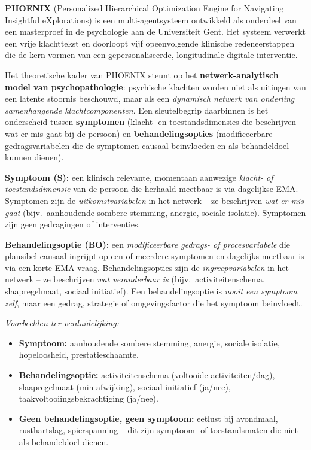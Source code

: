 \documentclass[11pt,a4paper]{article}
\begin{document}
\textbf{PHOENIX} (Personalized Hierarchical Optimization Engine for Navigating
Insightful eXplorations) is een multi-agentsysteem ontwikkeld als onderdeel van
een masterproef in de psychologie aan de Universiteit Gent. Het systeem verwerkt
een vrije klachttekst en doorloopt vijf opeenvolgende klinische redeneerstappen
die de kern vormen van een gepersonaliseerde, longitudinale digitale interventie.

Het theoretische kader van PHOENIX steunt op het \textbf{netwerk-analytisch model
van psychopathologie}: psychische klachten worden niet
als uitingen van een latente stoornis beschouwd, maar als een \emph{dynamisch
netwerk van onderling samenhangende klachtcomponenten}. Een sleutelbegrip daarbinnen
is het onderscheid tussen \textbf{symptomen} (klacht- en toestandsdimensies die
beschrijven wat er mis gaat bij de persoon) en \textbf{behandelingsopties}
(modificeerbare gedragsvariabelen die de symptomen causaal beinvloeden en als
behandeldoel kunnen dienen).

\vspace{0.4em}
\begin{instrbox}[title={Kerndefinities: symptoom versus behandelingsoptie}]
\small
\textbf{Symptoom (S):} een klinisch relevante, momentaan aanwezige
\emph{klacht- of toestandsdimensie} van de persoon die herhaald meetbaar is via
dagelijkse EMA. Symptomen zijn de \emph{uitkomstvariabelen} in het netwerk -- ze
beschrijven \emph{wat er mis gaat} (bijv.\ aanhoudende sombere stemming, anergie,
sociale isolatie). Symptomen zijn geen gedragingen of interventies.

\medskip
\textbf{Behandelingsoptie (BO):} een \emph{modificeerbare gedrags- of procesvariabele}
die plausibel causaal ingrijpt op een of meerdere symptomen en dagelijks meetbaar
is via een korte EMA-vraag. Behandelingsopties zijn de \emph{ingreepvariabelen} in het
netwerk -- ze beschrijven \emph{wat veranderbaar is} (bijv.\ activiteitenschema,
slaapregelmaat, sociaal initiatief). Een behandelingsoptie is \emph{nooit een symptoom zelf},
maar een gedrag, strategie of omgevingsfactor die het symptoom beinvloedt.

\medskip\small
\textit{Voorbeelden ter verduidelijking:}
\begin{itemize}[topsep=1pt,itemsep=0pt]
\item \textbf{Symptoom:} aanhoudende sombere stemming, anergie, sociale isolatie, hopeloosheid, prestatieschaamte.
\item \textbf{Behandelingsoptie:} activiteitenschema (voltooide activiteiten/dag), slaapregelmaat (min afwijking),
sociaal initiatief (ja/nee), taakvoltooiingsbekrachtiging (ja/nee).
\item \textbf{Geen behandelingsoptie, geen symptoom:} eetlust bij avondmaal, rusthartslag,
spierspanning -- dit zijn symptoom- of toestandsmaten die niet als behandeldoel dienen.
\end{itemize}
\end{instrbox}
\end{document}
